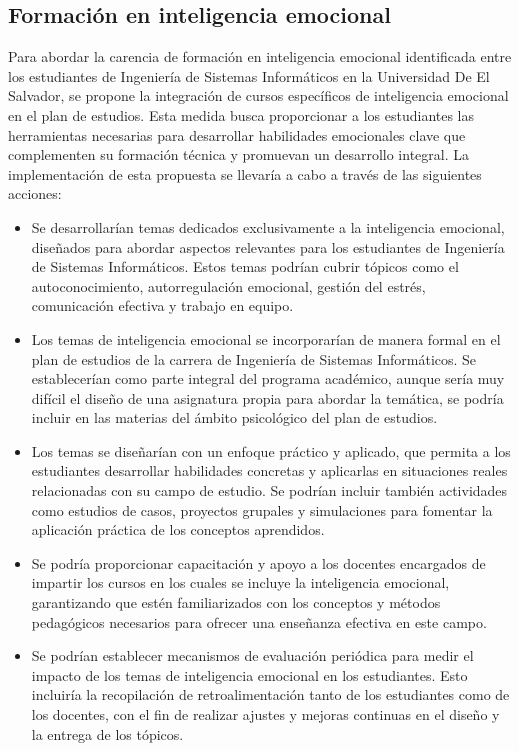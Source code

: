 \documentclass[journal]{IEEEtran}
\begin{document}
\subsection{Formación en inteligencia emocional}
Para abordar la carencia de formación en inteligencia emocional identificada entre los estudiantes de Ingeniería de Sistemas Informáticos en la Universidad De El Salvador, se propone la integración de cursos específicos de inteligencia emocional en el plan de estudios. Esta medida busca proporcionar a los estudiantes las herramientas necesarias para desarrollar habilidades emocionales clave que complementen su formación técnica y promuevan un desarrollo integral. La implementación de esta propuesta se llevaría a cabo a través de las siguientes acciones:\\
\begin{itemize}
	\item Se desarrollarían temas dedicados exclusivamente a la inteligencia emocional, diseñados para abordar aspectos relevantes para los estudiantes de Ingeniería de Sistemas Informáticos. Estos temas podrían cubrir tópicos como el autoconocimiento, autorregulación emocional, gestión del estrés, comunicación efectiva y trabajo en equipo.
	\item Los temas de inteligencia emocional se incorporarían de manera formal en el plan de estudios de la carrera de Ingeniería de Sistemas Informáticos. Se establecerían como parte integral del programa académico, aunque sería muy difícil el diseño de una asignatura propia para abordar la temática, se podría incluir en las materias del ámbito psicológico del plan de estudios.
	\item Los temas se diseñarían con un enfoque práctico y aplicado, que permita a los estudiantes desarrollar habilidades concretas y aplicarlas en situaciones reales relacionadas con su campo de estudio. Se podrían incluir también actividades como estudios de casos, proyectos grupales y simulaciones para fomentar la aplicación práctica de los conceptos aprendidos.
	\item Se podría proporcionar capacitación y apoyo a los docentes encargados de impartir los cursos en los cuales se incluye la inteligencia emocional, garantizando que estén familiarizados con los conceptos y métodos pedagógicos necesarios para ofrecer una enseñanza efectiva en este campo.
	\item Se podrían establecer mecanismos de evaluación periódica para medir el impacto de los temas de inteligencia emocional en los estudiantes. Esto incluiría la recopilación de retroalimentación tanto de los estudiantes como de los docentes, con el fin de realizar ajustes y mejoras continuas en el diseño y la entrega de los tópicos.
\end{itemize}
\end{document}
